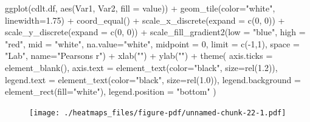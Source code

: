 \documentclass[
  letterpaper,
  DIV=11,
  numbers=noendperiod]{scrreprt}
\newenvironment{Shaded}{\begin{snugshade}}{\end{snugshade}}
\newcommand{\AttributeTok}[1]{\textcolor[rgb]{0.40,0.45,0.13}{#1}}
\newcommand{\DecValTok}[1]{\textcolor[rgb]{0.68,0.00,0.00}{#1}}
\newcommand{\FloatTok}[1]{\textcolor[rgb]{0.68,0.00,0.00}{#1}}
\newcommand{\FunctionTok}[1]{\textcolor[rgb]{0.28,0.35,0.67}{#1}}
\newcommand{\NormalTok}[1]{\textcolor[rgb]{0.00,0.23,0.31}{#1}}
\newcommand{\SpecialCharTok}[1]{\textcolor[rgb]{0.37,0.37,0.37}{#1}}
\newcommand{\StringTok}[1]{\textcolor[rgb]{0.13,0.47,0.30}{#1}}
\begin{document}
\begin{Shaded}
\begin{Highlighting}[]
\FunctionTok{ggplot}\NormalTok{(cdlt.df, }\FunctionTok{aes}\NormalTok{(Var1, Var2, }\AttributeTok{fill =}\NormalTok{ value)) }\SpecialCharTok{+} 
  \FunctionTok{geom\_tile}\NormalTok{(}\AttributeTok{color=}\StringTok{"white"}\NormalTok{, }\AttributeTok{linewidth=}\FloatTok{1.75}\NormalTok{) }\SpecialCharTok{+}
  \FunctionTok{coord\_equal}\NormalTok{() }\SpecialCharTok{+}
  \FunctionTok{scale\_x\_discrete}\NormalTok{(}\AttributeTok{expand =} \FunctionTok{c}\NormalTok{(}\DecValTok{0}\NormalTok{, }\DecValTok{0}\NormalTok{)) }\SpecialCharTok{+}
  \FunctionTok{scale\_y\_discrete}\NormalTok{(}\AttributeTok{expand =} \FunctionTok{c}\NormalTok{(}\DecValTok{0}\NormalTok{, }\DecValTok{0}\NormalTok{)) }\SpecialCharTok{+} 
  \FunctionTok{scale\_fill\_gradient2}\NormalTok{(}\AttributeTok{low =} \StringTok{"blue"}\NormalTok{, }\AttributeTok{high =} \StringTok{"red"}\NormalTok{, }\AttributeTok{mid =} \StringTok{"white"}\NormalTok{,}
                       \AttributeTok{na.value=}\StringTok{"white"}\NormalTok{,}
                       \AttributeTok{midpoint =} \DecValTok{0}\NormalTok{, }\AttributeTok{limit =} \FunctionTok{c}\NormalTok{(}\SpecialCharTok{{-}}\DecValTok{1}\NormalTok{,}\DecValTok{1}\NormalTok{), }\AttributeTok{space =} \StringTok{"Lab"}\NormalTok{, }
                       \AttributeTok{name=}\StringTok{"Pearson\textquotesingle{}s r"}\NormalTok{)  }\SpecialCharTok{+}
  \FunctionTok{xlab}\NormalTok{(}\StringTok{""}\NormalTok{) }\SpecialCharTok{+} 
  \FunctionTok{ylab}\NormalTok{(}\StringTok{""}\NormalTok{) }\SpecialCharTok{+}
  \FunctionTok{theme}\NormalTok{(}
    \AttributeTok{axis.ticks =} \FunctionTok{element\_blank}\NormalTok{(), }
    \AttributeTok{axis.text =} \FunctionTok{element\_text}\NormalTok{(}\AttributeTok{color=}\StringTok{"black"}\NormalTok{, }\AttributeTok{size=}\FunctionTok{rel}\NormalTok{(}\FloatTok{1.2}\NormalTok{)),}
    \AttributeTok{legend.text =} \FunctionTok{element\_text}\NormalTok{(}\AttributeTok{color=}\StringTok{"black"}\NormalTok{, }\AttributeTok{size=}\FunctionTok{rel}\NormalTok{(}\FloatTok{1.0}\NormalTok{)),}
    \AttributeTok{legend.background =} \FunctionTok{element\_rect}\NormalTok{(}\AttributeTok{fill=}\StringTok{"white"}\NormalTok{),}
    \AttributeTok{legend.position =} \StringTok{"bottom"}
\NormalTok{  )}
\end{Highlighting}
\end{Shaded}

\begin{figure}[H]

{\centering \texttt{[image: ./heatmaps\_files/figure-pdf/unnamed-chunk-22-1.pdf]}

}

\end{figure}
\end{document}
